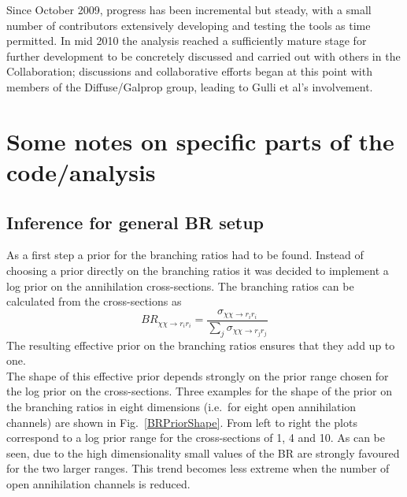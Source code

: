 \documentclass{article}
\begin{document}
Since October 2009, progress has been incremental but steady, with a small number of contributors extensively developing and testing the tools as time permitted.  In mid 2010 the analysis reached a sufficiently mature stage for further development to be concretely discussed and carried out with others in the Collaboration; discussions and collaborative efforts began at this point with members of the Diffuse/Galprop group, leading to Gulli et al's involvement.

\section{Some notes on specific parts of the code/analysis}

\subsection{Inference for general BR setup}

As a first step a prior for the branching ratios had to be found. Instead of choosing a prior directly on the branching ratios it was decided to implement a log prior on the annihilation cross-sections. The branching ratios can be calculated from the cross-sections as
\begin{equation}
BR_{\chi\chi \rightarrow r_i r_i} = \frac{\sigma_{\chi\chi \rightarrow r_i r_i}}{\sum_j \sigma_{\chi\chi \rightarrow r_j r_j}}
\end{equation}
The resulting effective prior on the branching ratios ensures that they add up to one. \\

The shape of this effective prior depends strongly on the prior range chosen for the log prior on the cross-sections. Three examples for the shape of the prior on the branching ratios in eight dimensions (i.e.\ for eight open annihilation channels) are shown in Fig.~\ref{BRPriorShape}. From left to right the plots correspond to a log prior range for the cross-sections of 1, 4 and 10. As can be seen, due to the high dimensionality small values of the BR are strongly favoured for the two larger ranges. This trend becomes less extreme when the number of open annihilation channels is reduced. \\
\end{document}
